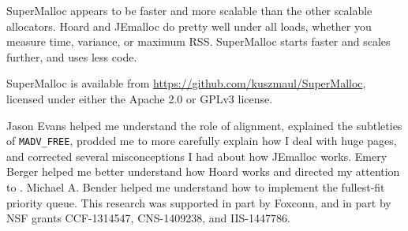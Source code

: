 \documentclass[natbib,sort&compress]{sigplanconf}
\newcommand{\code}[1]{\texttt{#1}}
\begin{document}



SuperMalloc appears to be faster and more scalable than the other
scalable allocators.  Hoard and JEmalloc do pretty well under all
loads, whether you measure time, variance, or maximum RSS.
SuperMalloc starts faster and scales further, and uses less code.

SuperMalloc is available from
\url{https://github.com/kuszmaul/SuperMalloc}, licensed under either
the Apache 2.0 or GPLv3 license.

\acks

Jason Evans helped me understand the role of alignment, explained the
subtleties of \code{MADV_FREE}, prodded me to more carefully explain
how I deal with huge pages, and corrected several misconceptions I had
about how JEmalloc works.  Emery Berger helped me better understand
how Hoard works and directed my attention to \cite{HertzFeBe05,
  YangBeKa06}.  Michael A. Bender helped me understand how to
implement the fullest-fit priority queue.  This research was supported
in part by Foxconn, and in part by NSF grants CCF-1314547,
CNS-1409238, and IIS-1447786.

{\raggedright

\renewcommand{\bibfont}{\normalsize}

}

\end{document}
